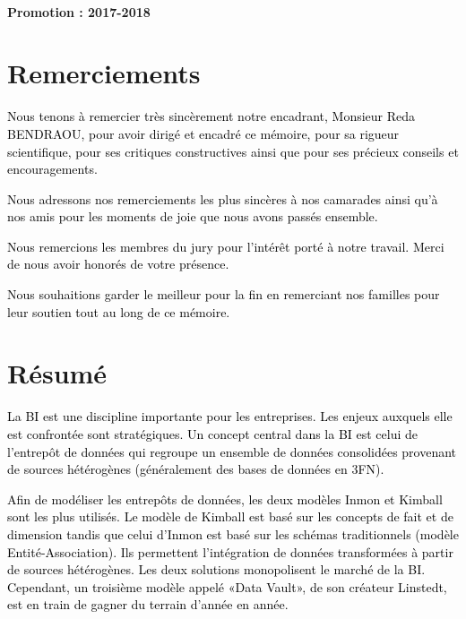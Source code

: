 \documentclass[a4paper,12pt]{report}
\begin{document}
		~~\\
		\vskip 0.3in
		\begin{center}
			\vspace{0.3cm} \textbf{Promotion : 2017-2018}
		\end{center}
	\newpage

\newpage
\chapter*{Remerciements}


\textcolor{black}{Nous tenons à remercier très sincèrement notre encadrant, Monsieur Reda BENDRAOU, pour avoir dirigé et encadré ce mémoire, pour sa rigueur scientifique, pour ses critiques constructives ainsi que pour ses précieux conseils et encouragements.}


\textcolor{black}{Nous adressons nos remerciements les plus sincères à nos camarades ainsi qu’à nos amis pour les moments de joie que nous 
avons passés ensemble.}



\textcolor{black}{Nous remercions les membres du jury pour l’intérêt porté à notre travail. 
Merci de nous avoir honorés de votre présence.}



\textcolor{black}{Nous souhaitions garder le meilleur pour la fin en remerciant nos familles pour leur soutien tout au long de ce mémoire.
}





\newpage
\chapter*{Résumé}

\textcolor{black}{La BI est une  discipline importante pour les entreprises. Les enjeux auxquels elle est confrontée sont stratégiques. Un concept central dans la BI est celui de l’entrepôt de données qui regroupe un ensemble de données consolidées provenant de sources hétérogènes (généralement des bases de données en 3FN). }

\textcolor{black}{Afin de  modéliser les entrepôts de données, les deux  modèles  Inmon  et Kimball  sont les plus utilisés. Le modèle de Kimball est basé sur les concepts de fait et de dimension tandis que celui d’Inmon est basé sur les schémas traditionnels (modèle Entité-Association). Ils permettent l’intégration de données transformées à partir de sources hétérogènes. Les deux solutions monopolisent le marché de la BI. Cependant, un troisième modèle appelé «Data Vault», de son créateur Linstedt, est en train de gagner du terrain d’année en année. 
}
\end{document}
